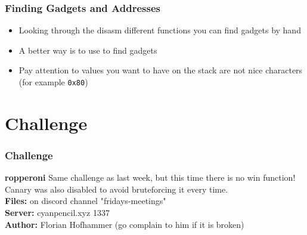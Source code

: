 \documentclass[aspectratio=169]{beamer}
\newcommand{\hex}[1]{\texttt{0x#1}}
\begin{document}
\begin{frame}[fragile]
    \frametitle{Finding Gadgets and Addresses}
    \begin{itemize}
		\item Looking through the disasm different functions you can find gadgets by hand
        \item A better way is to use  to find gadgets
        \item Pay attention to values you want to have on the stack are not nice characters (for example \hex{80})
    \end{itemize}
\end{frame}
\section{Challenge}
\begin{frame}
    \frametitle{Challenge}
    {
        \begin{alertblock}{\textbf{ropperoni}}
            Same challenge as last week, but this time there is no win function!\\
			Canary was also disabled to avoid bruteforcing it every time. \\
            \textbf{Files:} on discord channel "fridays-meetings"\\
            \textbf{Server:} cyanpencil.xyz 1337\\
            \textbf{Author:} Florian Hofhammer (go complain to him if it is broken)
        \end{alertblock}
    }
\end{frame}
\end{document}
